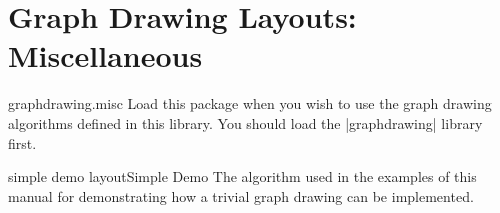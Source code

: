 %
%
%

\section{Graph Drawing Layouts: Miscellaneous}
\label{section-last-graphdrawing-library-in-manual}


\begin{tikzlibrary}{graphdrawing.misc}
  Load this package when you wish to use the graph drawing algorithms
  defined in this library. You should load the |graphdrawing| library first.
\end{tikzlibrary}


\begin{gdalgorithm}{simple demo layout}{Simple Demo}
  The algorithm used in the examples of this manual for demonstrating
  how a trivial graph drawing can be implemented.
\end{gdalgorithm}




